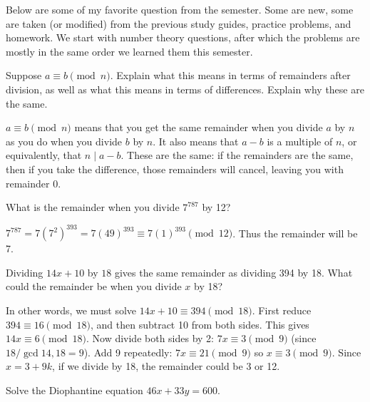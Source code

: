 Below are some of my favorite question from the semester.  Some are new, some are taken (or modified) from the previous study guides, practice problems, and homework.  We start with number theory questions, after which the problems are mostly in the same order we learned them this semester.

\begin{squestions}

\question Suppose $a \equiv b \pmod{n}$.  Explain what this means in terms of remainders after division, as well as what this means in terms of differences.  Explain why these are the same.

	\begin{answer}
		$a \equiv b \pmod{n}$ means that you get the same remainder when you divide $a$ by $n$ as you do when you divide $b$ by $n$.  It also means that $a-b$ is a multiple of $n$, or equivalently, that $n \mid a-b$.  These are the same: if the remainders are the same, then if you take the difference, those remainders will cancel, leaving you with remainder 0.
	\end{answer}





\question What is the remainder when you divide $7^{787}$ by 12?

	\begin{answer}
		$7^{787} = 7(7^2)^{393} = 7(49)^{393} \equiv 7(1)^{393} \pmod{12}$.  Thus the remainder will be 7.
	\end{answer}





\question Dividing $14x + 10$ by $18$ gives the same remainder as dividing 394 by 18.  What could the remainder be when you divide $x$ by 18?

	\begin{answer}
		In other words, we must solve $14x + 10 \equiv 394 \pmod{18}$.  First reduce $394 \equiv 16\pmod{18}$, and then subtract 10 from both sides.  This gives $14x \equiv 6 \pmod{18}$.  Now divide both sides by 2: $7x \equiv 3 \pmod{9}$ (since $18/\gcd{14,18} = 9$).  Add 9 repeatedly: $7x \equiv 21 \pmod{9}$ so $x \equiv 3 \pmod{9}$.  Since $x = 3 + 9k$, if we divide by 18, the remainder could be 3 or 12.
	\end{answer}





\question Solve the Diophantine equation $46x + 33y = 600$.


\end{squestions}
